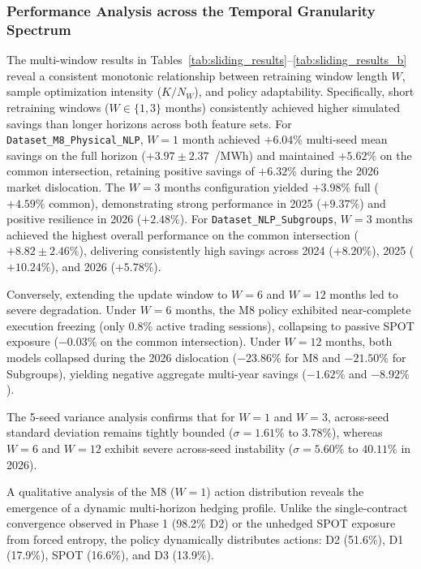 \subsubsection{Performance Analysis across the Temporal Granularity Spectrum}

The multi-window results in Tables~\ref{tab:sliding_results}--\ref{tab:sliding_results_b} reveal a consistent monotonic relationship between retraining window length $W$, sample optimization intensity ($K/N_W$), and policy adaptability. Specifically, short retraining windows ($W \in \{1, 3\}$ months) consistently achieved higher simulated savings than longer horizons across both feature sets. For \texttt{Dataset\_\allowbreak M8\_\allowbreak Physical\_\allowbreak NLP}, $W=1\text{ month}$ achieved $+6.04\%$ multi-seed mean savings on the full horizon ($+3.97 \pm 2.37$~\texteuro/MWh) and maintained $+5.62\%$ on the common intersection, retaining positive savings of $+6.32\%$ during the 2026 market dislocation. The $W=3\text{ months}$ configuration yielded $+3.98\%$ full ($+4.59\%$ common), demonstrating strong performance in 2025 ($+9.37\%$) and positive resilience in 2026 ($+2.48\%$). For \texttt{Dataset\_\allowbreak NLP\_\allowbreak Subgroups}, $W=3\text{ months}$ achieved the highest overall performance on the common intersection ($\mathbf{+8.82 \pm 2.46\%}$), delivering consistently high savings across 2024 ($+8.20\%$), 2025 ($+10.24\%$), and 2026 ($+5.78\%$).

Conversely, extending the update window to $W=6$ and $W=12$ months led to severe degradation. Under $W=6\text{ months}$, the M8 policy exhibited near-complete execution freezing (only 0.8\% active trading sessions), collapsing to passive SPOT exposure ($-0.03\%$ on the common intersection). Under $W=12\text{ months}$, both models collapsed during the 2026 dislocation ($-23.86\%$ for M8 and $-21.50\%$ for Subgroups), yielding negative aggregate multi-year savings ($-1.62\%$ and $-8.92\%$).

The 5-seed variance analysis confirms that for $W=1$ and $W=3$, across-seed standard deviation remains tightly bounded ($\sigma = 1.61\%$ to $3.78\%$), whereas $W=6$ and $W=12$ exhibit severe across-seed instability ($\sigma = 5.60\%$ to $40.11\%$ in 2026).

A qualitative analysis of the M8 ($W=1$) action distribution reveals the emergence of a dynamic multi-horizon hedging profile. Unlike the single-contract convergence observed in Phase 1 (98.2\% D2) or the unhedged SPOT exposure from forced entropy, the policy dynamically distributes actions: D2 (51.6\%), D1 (17.9\%), SPOT (16.6\%), and D3 (13.9\%).


